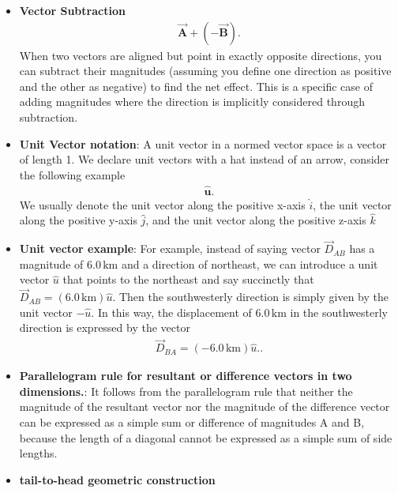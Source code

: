 \documentclass{report}
\begin{document}
\begin{itemize}
        \item \textbf{Vector Subtraction}
            \begin{align*}
                \vec{\textbf{A}} + (-\vec{\textbf{B}})
            .\end{align*}
            \bigbreak \noindent 
            When two vectors are aligned but point in exactly opposite directions, you can subtract their magnitudes (assuming you define one direction as positive and the other as negative) to find the net effect. This is a specific case of adding magnitudes where the direction is implicitly considered through subtraction.
        \item \textbf{Unit Vector notation}:  A unit vector in a normed vector space is a vector of length 1. We declare unit vectors with a hat instead of an arrow, consider the following example
            \begin{align*}
                \hat{\textbf{u}}
            .\end{align*}
            We usually denote the unit vector along the positive x-axis $\hat{i}$, the unit vector along the positive y-axis $\hat{j}$, and the unit vector along the positive z-axis $\hat{k}$
        \item \textbf{Unit vector example}: For example, instead of saying vector $\vec{D}_{AB}$ has a magnitude of $6.0\,\text{km}$ and a direction of northeast, we can introduce a unit vector $\hat{u}$ that points to the northeast and say succinctly that $\vec{D}_{AB} = (6.0\,\text{km})\hat{u}$. Then the southwesterly direction is simply given by the unit vector $-\hat{u}$. In this way, the displacement of $6.0\,\text{km}$ in the southwesterly direction is expressed by the vector
            \begin{align*}
                    \vec{D}_{BA} = (-6.0\,\text{km})\hat{u}.
            .\end{align*}
        \item \textbf{Parallelogram rule for resultant or difference vectors in two dimensions.}:
            \bigbreak \noindent 
            \bigbreak \noindent 
            It follows from the parallelogram rule that neither the magnitude of the resultant vector nor the magnitude of the difference vector can be expressed as a simple sum or difference of magnitudes A and B, because the length of a diagonal cannot be expressed as a simple sum of side lengths.
        \item \textbf{tail-to-head geometric construction}
            \bigbreak \noindent 

\end{itemize}
\end{document}
